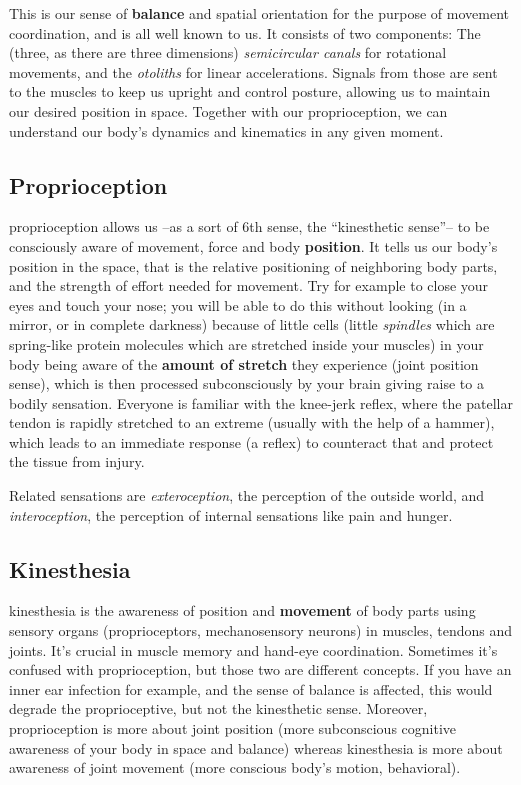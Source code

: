 This is our sense of \textbf{balance} and spatial orientation for the purpose of movement coordination, and is all well known to us.
It consists of two components: The (three, as there are three dimensions) \textit{semicircular canals} for rotational movements, and the \textit{otoliths} for linear accelerations.
Signals from those are sent to the muscles to keep us upright and control posture, allowing us to maintain our desired position in space.
Together with our proprioception, we can understand our body's dynamics and kinematics in any given moment.

\subsection{Proprioception}\label{subsec:proprioception}

\Gls{proprioception} allows us --as a sort of 6th sense, the ``kinesthetic sense''-- to be consciously aware of movement, force and body \textbf{position}.
It tells us our body's position in the space, that is the relative positioning of neighboring body parts, and the strength of effort needed for movement.
Try for example to close your eyes and touch your nose; you will be able to do this without looking (in a mirror, or in complete darkness) because of little cells (little \textit{spindles} which are spring-like protein molecules which are stretched inside your muscles) in your body being aware of the \textbf{amount of stretch} they experience (joint position sense), which is then processed subconsciously by your brain giving raise to a bodily sensation.
Everyone is familiar with the knee-jerk reflex, where the patellar tendon is rapidly stretched to an extreme (usually with the help of a hammer), which leads to an immediate response (a reflex) to counteract that and protect the tissue from injury.

Related sensations are \textit{exteroception}, the perception of the outside world, and \textit{interoception}, the perception of internal sensations like pain and hunger.

\subsection{Kinesthesia}\label{subsec:kinesthesia}

\Gls{kinesthesia} is the awareness of position and \textbf{movement} of body parts using sensory organs (proprioceptors, mechanosensory neurons) in muscles, tendons and joints.
It's crucial in muscle memory and hand-eye coordination.
Sometimes it's confused with proprioception, but those two are different concepts.
If you have an inner ear infection for example, and the sense of balance is affected, this would degrade the proprioceptive, but not the kinesthetic sense.
Moreover, proprioception is more about joint position (more subconscious cognitive awareness of your body in space and balance) whereas kinesthesia is more about awareness of joint movement (more conscious body's motion, behavioral).

